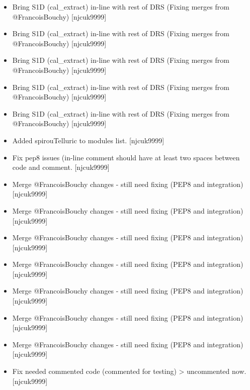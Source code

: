 \documentclass[a4paper,10pt,english]{report}
\begin{document}
\begin{itemize}
\item {} 
Bring S1D (cal\_extract) in-line with rest of DRS (Fixing merges from
@FrancoisBouchy) {[}njcuk9999{]}

\item {} 
Bring S1D (cal\_extract) in-line with rest of DRS (Fixing merges from
@FrancoisBouchy) {[}njcuk9999{]}

\item {} 
Bring S1D (cal\_extract) in-line with rest of DRS (Fixing merges from
@FrancoisBouchy) {[}njcuk9999{]}

\item {} 
Bring S1D (cal\_extract) in-line with rest of DRS (Fixing merges from
@FrancoisBouchy) {[}njcuk9999{]}

\item {} 
Bring S1D (cal\_extract) in-line with rest of DRS (Fixing merges from
@FrancoisBouchy) {[}njcuk9999{]}

\item {} 
Added spirouTelluric to modules list. {[}njcuk9999{]}

\item {} 
Fix pep8 issues (in-line comment should have at least two spaces
between code and comment. {[}njcuk9999{]}

\item {} 
Merge @FrancoisBouchy changes - still need fixing (PEP8 and
integration) {[}njcuk9999{]}

\item {} 
Merge @FrancoisBouchy changes - still need fixing (PEP8 and
integration) {[}njcuk9999{]}

\item {} 
Merge @FrancoisBouchy changes - still need fixing (PEP8 and
integration) {[}njcuk9999{]}

\item {} 
Merge @FrancoisBouchy changes - still need fixing (PEP8 and
integration) {[}njcuk9999{]}

\item {} 
Merge @FrancoisBouchy changes - still need fixing (PEP8 and
integration) {[}njcuk9999{]}

\item {} 
Merge @FrancoisBouchy changes - still need fixing (PEP8 and
integration) {[}njcuk9999{]}

\item {} 
Merge @FrancoisBouchy changes - still need fixing (PEP8 and
integration) {[}njcuk9999{]}

\item {} 
Fix needed commented code (commented for testing) \textendash{}\textgreater{} uncommented now.
{[}njcuk9999{]}


\end{itemize}
\end{document}
